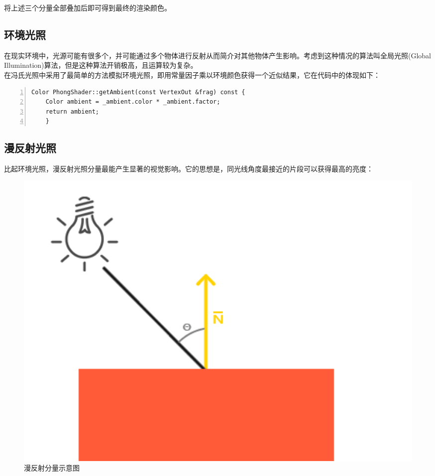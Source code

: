 \begin{spacing}{2.5}
    将上述三个分量全部叠加后即可得到最终的渲染颜色。
    
    \subsection{环境光照}
    
    在现实环境中，光源可能有很多个，并可能通过多个物体进行反射从而简介对其他物体产生影响。考虑到这种情况的算法叫全局光照(Global Illumination)算法，但是这种算法开销极高，且运算较为复杂。\\
    在冯氏光照中采用了最简单的方法模拟环境光照，即用常量因子乘以环境颜色获得一个近似结果，它在代码中的体现如下：
   
   
	\begin{lstlisting}[language={[ANSI]C},numbers=left,numberstyle=\tiny,%frame=shadowbox,
   rulesepcolor=\color{red!20!green!20!blue!20},
   keywordstyle=\color{blue!70!black},
   commentstyle=\color{blue!90!},
   basicstyle=\ttfamily]
	Color PhongShader::getAmbient(const VertexOut &frag) const {
    Color ambient = _ambient.color * _ambient.factor;
    return ambient;
	}
	\end{lstlisting}
	
	\subsection{漫反射光照}
	
	比起环境光照，漫反射光照分量最能产生显著的视觉影响。它的思想是，同光线角度最接近的片段可以获得最高的亮度：
	
	\begin{figure}[H]
    	\centering
		\includegraphics[width=1.0\textwidth]{images/diffuse_light.png}
		\caption{漫反射分量示意图}
		\label{diffuse_light}
    \end{figure}
	

\end{spacing}
